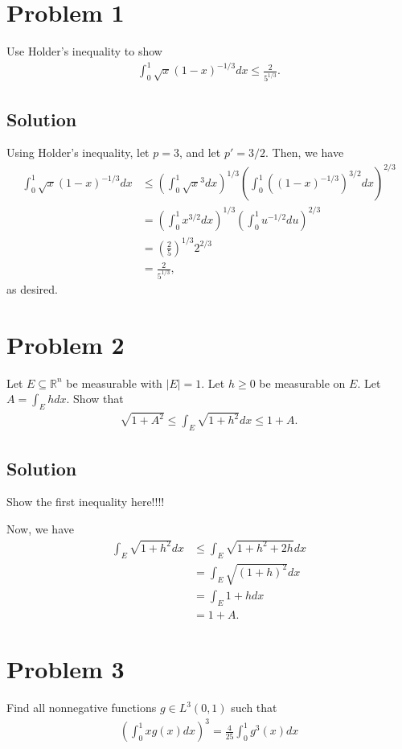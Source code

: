 \documentclass[10pt,a4paper]{article}
\author{Jeremiah Givens}
\theoremstyle{theorem}
\theoremstyle{definition}
\begin{document}
\section*{Problem 1}
Use Holder's inequality to show 
\begin{align*}
\int_0^1 \sqrt{x} (1 - x)^{-1/3} dx \leq \frac{2}{5^{1/3}}.
\end{align*}

\subsection*{Solution}
Using Holder's inequality, let $p = 3$, and let $p' = 3/2$. Then, we have
\begin{align*}
\int_0^1 \sqrt{x} (1 - x)^{-1/3} dx &\leq \left( \int_0^1 \sqrt{x}^{3} dx \right)^{1/3} \left( \int_0^1 ((1 - x)^{-1/3})^{3/2} dx \right)^{2/3}\\
&= \left( \int_0^1 x^{3/2} dx \right)^{1/3} \left( \int_0^1 u^{-1/2} du \right)^{2/3}\\
&= \left( \frac{2}{5} \right)^{1/3}  2^{2/3}\\
&=  \frac{2}{5^{1/3}},
\end{align*}
as desired.

\section*{Problem 2}
Let $E \subseteq \mathbb{R}^n$ be measurable with $|E| = 1$. Let $h \geq 0$ be measurable on $E$. Let $A = \int_E h dx$. Show that 
\begin{align*}
\sqrt{1 + A^2} \leq \int_E \sqrt{1 + h^2} dx \leq 1 + A.
\end{align*}

\subsection*{Solution}
Show the first inequality here!!!!

Now, we have
\begin{align*}
\int_E \sqrt{1 + h^2} dx &\leq \int_E \sqrt{1 + h^2 + 2h} dx\\
&= \int_E \sqrt{(1 + h)^2} dx\\
&= \int_E 1 + h dx\\
&= 1 + A.
\end{align*}

\section*{Problem 3}
Find all nonnegative functions $g \in L^3(0, 1)$ such that 
\begin{align*}
\left( \int_0^1 x g(x)dx \right)^3 = \frac{4}{25} \int_0^1 g^3(x)dx
\end{align*}
\end{document}
